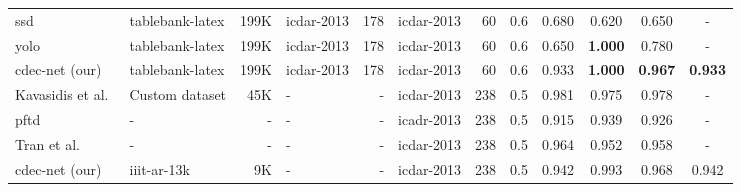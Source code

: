 \documentclass[a4paper,conference]{IEEEtran}
\begin{document}
\begin{table*}
\begin{center}
\begin{tabular}{|l| l | r|l |r|l|r| c| c c c c|}
{\sc ssd}~\cite{casado2019benefits} &{\sc t}able{\sc b}ank-{\sc l}a{\sc t}e{\sc x} &199K &{\sc icdar}-2013 &178 &{\sc icdar}-2013 &60 &0.6 &0.680 &0.620 &0.650 &- \\ 
{\sc yolo}~\cite{casado2019benefits}  &{\sc t}able{\sc b}ank-{\sc l}a{\sc t}e{\sc x} &199K &{\sc icdar}-2013 &178 &{\sc icdar}-2013 &60 &0.6 &0.650 &\textbf{1.000} &0.780 &- \\ 
{\sc cd}e{\sc c-n}et (our) &{\sc t}able{\sc b}ank-{\sc l}a{\sc t}e{\sc x} &199K &{\sc icdar}-2013 &178 &{\sc icdar}-2013 &60 &0.6 &0.933 &\textbf{1.000} &\textbf{0.967} &\textbf{0.933} \\ \hhline{|=|=|=|=|=|=|=|=|====|}
Kavasidis et al.~\cite{kavasidis2018saliencybased} &Custom dataset &45K &- &- &{\sc icdar}-2013 &238 &0.5 &0.981& 0.975& 0.978 &- \\ 
{\sc pftd}~\cite{melinda2019parameter} &- &- &- &- &{\sc icadr}-2013 &238 &0.5 &0.915& 0.939& 0.926& - \\  
Tran et al.~\cite{tran2015table} &- &- &- &- &{\sc icdar}-2013 &238 &0.5 &0.964 &0.952 &0.958 &- \\ 
 \hhline{|=|=|=|=|=|=|=|=|====|}
{\sc cd}e{\sc c-n}et (our) &{\sc iiit-ar-13k} &9K &- &- &{\sc icdar}-2013 &238 &0.5 &0.942 &0.993 &0.968 &0.942 \\ \hline
\end{tabular}
\end{center}
\caption{Illustrates comparison between the proposed {\sc cd}e{\sc c-n}et and state-of-the-art techniques on {\sc icdar-2013} dataset. {\sc \textbf{a:}} indicates anchor optimization, {\sc \textbf{pg:}} indicates post-processing technique, {\sc \textbf{sf:}} indicates semantic features, {\sc \textbf{d1:}} indicates Marmot+{\sc unlv}+{\sc icdar-2017}, \textbf{*:} indicates the authors reported 0.996 in table however in discussion they mentioned 0.994. {\sc cd}\textbf{e}{\sc c-n}et\textbf{:} indicates a single  model which is trained with {\sc iiit-ar-13k} dataset. \label{table_icdar_2013}}
\end{table*}
\end{document}

